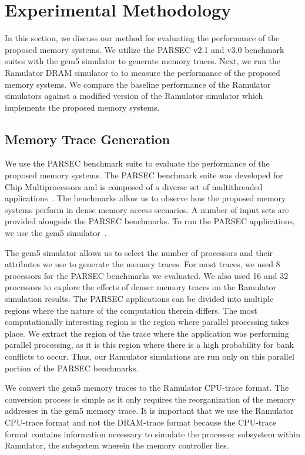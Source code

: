 \section{Experimental Methodology}
\label{sec:experimentalmethodology}

In this section, we discuss our method for evaluating the performance of the proposed memory systems. We utilize the PARSEC v2.1 and v3.0 benchmark suites with the gem5 simulator to generate memory traces. Next, we run the Ramulator DRAM simulator to to measure the performance of the proposed memory systems. We compare the baseline performance of the Ramulator simulators against a modified version of the Ramulator simulator which implements the proposed memory systems.

\subsection{Memory Trace Generation}

We use the PARSEC benchmark suite to evaluate the performance of the proposed memory systems. The PARSEC benchmark suite was developed for Chip Multiprocessors and is composed of a diverse set of multithreaded applications~\cite{bienia09parsec2}. The benchmarks allow us to observe how the proposed memory systems perform in dense memory access scenarios. A number of input sets are provided alongside the PARSEC benchmarks. To run the PARSEC applications, we use the gem5 simulator~\cite{parsec_2_1_m5}.

The gem5 simulator allows us to select the number of processors and their attributes we use to generate the memory traces. For most traces, we used 8 processors for the PARSEC benchmarks we evaluated. We also used 16 and 32 processors to explore the effects of denser memory traces on the Ramulator simulation results. The PARSEC applications can be divided into multiple regions where the nature of the computation therein differs. The most computationally interesting region is the region where parallel processing takes place. We extract the region of the trace where the application was performing parallel processing, as it is this region where there is a high probability for bank conflicts to occur. Thus, our Ramulator simulations are run only on this parallel portion of the PARSEC benchmarks.


We convert the gem5 memory traces to the Ramulator CPU-trace format. The conversion process is simple as it only requires the reorganization of the memory addresses in the gem5 memory trace. It is important that we use the Ramulator CPU-trace format and not the DRAM-trace format because the CPU-trace format contains information necessary to simulate the processor subsystem within Ramulator, the subsystem wherein the memory controller lies.

